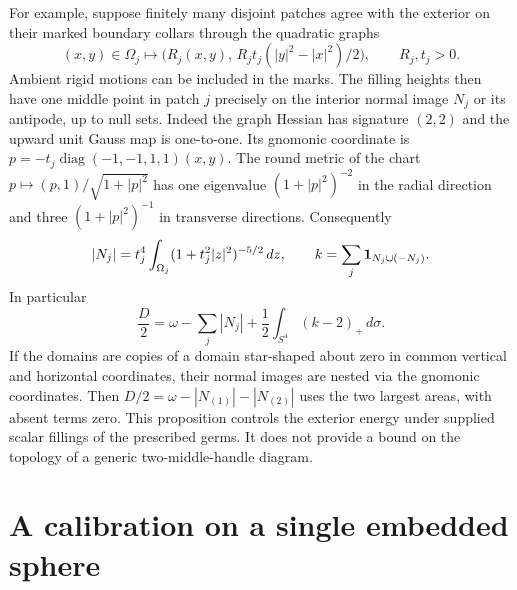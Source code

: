 \documentclass[11pt,letterpaper]{article}
\numberwithin{equation}{section}
\begin{document}
For example, suppose finitely many disjoint patches agree with the
exterior on their marked boundary collars through the quadratic
graphs
\[
 (x,y)\in\Omega_j\longmapsto
 \bigl(R_j(x,y),\,R_jt_j(|y|^2-|x|^2)/2\bigr),
 \qquad R_j,t_j>0 .
\]
Ambient rigid motions can be included in the marks. The filling
heights then have one middle point in patch \(j\) precisely on
the interior normal image \(N_j\) or its antipode, up to null
sets. Indeed the graph Hessian has signature \((2,2)\) and the
upward unit Gauss map is one-to-one. Its gnomonic coordinate is
\(p=-t_j\operatorname{diag}(-1,-1,1,1)(x,y)\). The round metric
of the chart \(p\mapsto(p,1)/\sqrt{1+|p|^2}\) has one
eigenvalue \((1+|p|^2)^{-2}\) in the radial direction and three
\((1+|p|^2)^{-1}\) in transverse directions. Consequently
\[
 |N_j|=t_j^4\int_{\Omega_j}(1+t_j^2|z|^2)^{-5/2}\,dz,\qquad
 k=\sum_j{\bf 1}_{N_j\cup(-N_j)}.
\]
In particular
\[
 \frac D2=\omega-\sum_j |N_j|+
                 \frac12\int_{S^4}(k-2)_+\,d\sigma .
\]
If the domains are copies of a domain star-shaped about zero in
common vertical and horizontal coordinates, their normal images
are nested via the gnomonic coordinates. Then
\(D/2=\omega-|N_{(1)}|-|N_{(2)}|\) uses the two largest areas,
with absent terms zero. This proposition controls the exterior
energy under supplied scalar fillings of the prescribed germs.
It does not provide a bound on the topology of a generic
two-middle-handle diagram.

\section{A calibration on a single embedded sphere}\label{sec:example}
\end{document}

